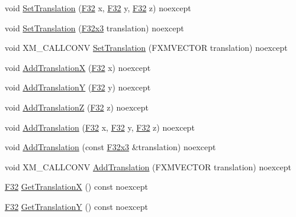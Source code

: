 \begin{DoxyCompactItemize}
void \hyperlink{classmage_1_1_transform_afb794877f9b538b5ce4b55e4cd8852f0}{Set\+Translation} (\hyperlink{namespacemage_aa97e833b45f06d60a0a9c4fc22ae02c0}{F32} x, \hyperlink{namespacemage_aa97e833b45f06d60a0a9c4fc22ae02c0}{F32} y, \hyperlink{namespacemage_aa97e833b45f06d60a0a9c4fc22ae02c0}{F32} z) noexcept
\item 
void \hyperlink{classmage_1_1_transform_a50f037f902afa811b596f745de5537fb}{Set\+Translation} (\hyperlink{namespacemage_a73fbe0da4b8d5bc156bb8453e5b63a17}{F32x3} translation) noexcept
\item 
void X\+M\+\_\+\+C\+A\+L\+L\+C\+O\+NV \hyperlink{classmage_1_1_transform_a0c93ec5483091d4be508e11d5c05579e}{Set\+Translation} (F\+X\+M\+V\+E\+C\+T\+OR translation) noexcept
\item 
void \hyperlink{classmage_1_1_transform_a1161f8c965e071dd59f1780d7a06952b}{Add\+TranslationX} (\hyperlink{namespacemage_aa97e833b45f06d60a0a9c4fc22ae02c0}{F32} x) noexcept
\item 
void \hyperlink{classmage_1_1_transform_abf9253ddafad2725ef6c6e2b4bd44b35}{Add\+TranslationY} (\hyperlink{namespacemage_aa97e833b45f06d60a0a9c4fc22ae02c0}{F32} y) noexcept
\item 
void \hyperlink{classmage_1_1_transform_a2554a3af167bb8ae9f4724921e6a3596}{Add\+TranslationZ} (\hyperlink{namespacemage_aa97e833b45f06d60a0a9c4fc22ae02c0}{F32} z) noexcept
\item 
void \hyperlink{classmage_1_1_transform_ae786c4135de007be509b5d5fe9d1a60b}{Add\+Translation} (\hyperlink{namespacemage_aa97e833b45f06d60a0a9c4fc22ae02c0}{F32} x, \hyperlink{namespacemage_aa97e833b45f06d60a0a9c4fc22ae02c0}{F32} y, \hyperlink{namespacemage_aa97e833b45f06d60a0a9c4fc22ae02c0}{F32} z) noexcept
\item 
void \hyperlink{classmage_1_1_transform_a971fd7417705ccf2f702c47d3a6c5bcb}{Add\+Translation} (const \hyperlink{namespacemage_a73fbe0da4b8d5bc156bb8453e5b63a17}{F32x3} \&translation) noexcept
\item 
void X\+M\+\_\+\+C\+A\+L\+L\+C\+O\+NV \hyperlink{classmage_1_1_transform_a931911a2ef61b9a74be444e4c65ee46a}{Add\+Translation} (F\+X\+M\+V\+E\+C\+T\+OR translation) noexcept
\item 
\hyperlink{namespacemage_aa97e833b45f06d60a0a9c4fc22ae02c0}{F32} \hyperlink{classmage_1_1_transform_a90b2c059a45964bf4de816a4b7e6c55c}{Get\+TranslationX} () const noexcept
\item 
\hyperlink{namespacemage_aa97e833b45f06d60a0a9c4fc22ae02c0}{F32} \hyperlink{classmage_1_1_transform_a3a806edeeca4db92bdfa4d401ba17cb4}{Get\+TranslationY} () const noexcept

\end{DoxyCompactItemize}
